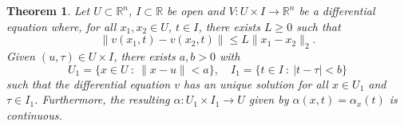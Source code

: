 \documentclass[letter-paper]{tufte-book}
\newtheorem{theorem}{\color{pastel-blue}Theorem}[section]
\begin{document}
\begin{theorem}
  Let $U \subset \mathbb{R}^n$, $I \subset \mathbb{R}$ be open and $V : U\times
  I \to \mathbb{R}^n$ be a differential equation where, for all $x_1, x_2 \in
  U$, $t \in I$, there exists $L \geq 0$ such that
  \begin{equation*}
    \|v(x_1, t) - v(x_2, t)\| \leq L \|x_1 - x_2\|_2.
  \end{equation*}
  Given $(u, \tau) \in U \times I$, there exists $a,b>0$ with
  \begin{equation*}
    U_1 = \{x \in U\ :\ \|x - u\| < a\}, \quad I_1 = \{t \in I\ :\ |t - \tau| < b\}
  \end{equation*}
  such that the differential equation $v$ has an unique solution for all $x \in
  U_1$ and $\tau \in I_1$. Furthermore, the resulting $\alpha : U_1 \times I_1
  \to U$ given by $\alpha(x, t) = \alpha_{x}(t)$ is continuous.
\end{theorem}
\end{document}
